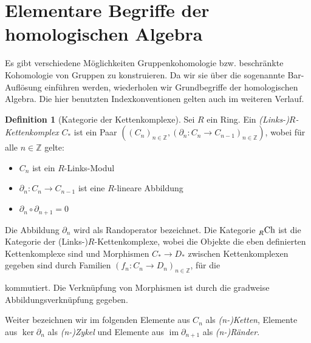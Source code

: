 \documentclass[a4paper,twoside,10pt]{scrreprt}
\DeclareMathOperator{\img}{im}
\newcommand{\Z}{\mathbb{Z}}
\theoremstyle{definition}
\newtheorem{definition}[satz]{Definition}
\begin{document}
\section{Elementare Begriffe der homologischen Algebra}
Es gibt verschiedene Möglichkeiten Gruppenkohomologie bzw. beschränkte Kohomologie von Gruppen zu konstruieren. Da wir sie über die sogenannte Bar-Auflösung einführen werden, wiederholen wir Grundbegriffe der homologischen Algebra. Die hier benutzten Indexkonventionen gelten auch im weiteren Verlauf.
\begin{definition}[Kategorie der Kettenkomplexe]\label{def:CatChainComplex}
Sei $R$ ein Ring. Ein \emph{(Links-)$R$-Kettenkomplex} $C_*$ ist ein Paar $\left(\left(C_n \right)_{n\in \Z},\left(\partial_n:C_n\to C_{n-1}\right)_{n\in \Z}\right)$, wobei für alle $n\in \Z$ gelte:
\begin{itemize}
\item $C_n$ ist ein $R$-Links-Modul
\item $\partial_n:C_n\to C_{n-1}$ ist eine $R$-lineare Abbildung
\item $\partial_n\circ \partial_{n+1}=0$
\end{itemize}
Die Abbildung $\partial_n$ wird als Randoperator bezeichnet.
Die Kategorie $\prescript{}{R}{\text{Ch}}$ ist die Kategorie der (Links-)$R$-Kettenkomplexe, wobei die Objekte die eben definierten Kettenkomplexe sind und Morphismen $C_*\to D_*$ zwischen Kettenkomplexen gegeben sind durch Familien $(f_n:C_n\to D_n)_{n\in \Z}$, für die
\begin{center}
\end{center}
kommutiert. Die Verknüpfung von Morphismen ist durch die gradweise Abbildungsverknüpfung gegeben.\par
Weiter bezeichnen wir im folgenden Elemente aus $C_n$ als \textit{(n-)Ketten}, Elemente aus $\ker\partial_n$ als \textit{(n-)Zykel} und Elemente aus $\img\partial_{n+1}$ als \textit{(n-)Ränder}.
\end{definition}
\end{document}
